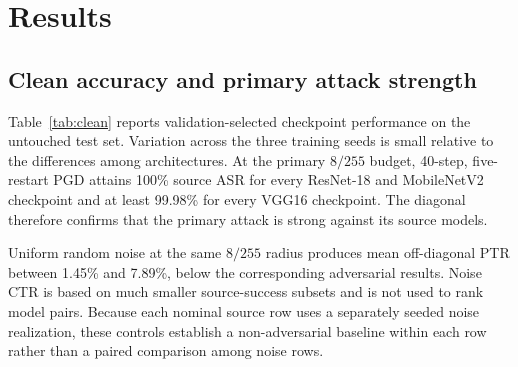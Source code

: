 \documentclass[10pt,twocolumn]{article}
\begin{document}
\section{Results}
\subsection{Clean accuracy and primary attack strength}
Table~\ref{tab:clean} reports validation-selected checkpoint performance on the untouched test set. Variation across the three training seeds is small relative to the differences among architectures. At the primary $8/255$ budget, 40-step, five-restart PGD attains 100\% source ASR for every ResNet-18 and MobileNetV2 checkpoint and at least 99.98\% for every VGG16 checkpoint. The diagonal therefore confirms that the primary attack is strong against its source models.

Uniform random noise at the same $8/255$ radius produces mean off-diagonal PTR between 1.45\% and 7.89\%, below the corresponding adversarial results. Noise CTR is based on much smaller source-success subsets and is not used to rank model pairs. Because each nominal source row uses a separately seeded noise realization, these controls establish a non-adversarial baseline within each row rather than a paired comparison among noise rows.

\begin{table}[t]
\centering
\caption{Clean test accuracy (\%) by training seed. The final column is the mean and sample standard deviation over three checkpoints.}
\label{tab:clean}
\end{table}

\begin{table}[t]
\centering
\caption{Mean source ASR (\%) over three seeds.}
\label{tab:asr}
\end{table}
\end{document}
